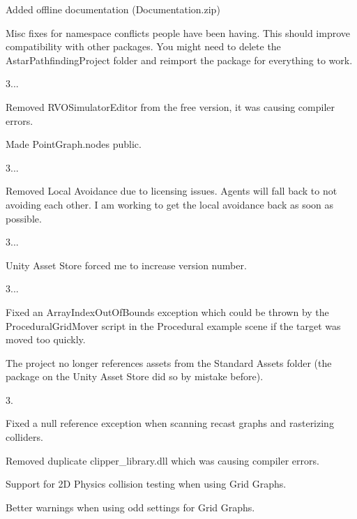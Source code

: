 \begin{DoxyItemize}
\begin{DoxyItemize}
\item Added offline documentation (Documentation.\+zip)
\item Misc fixes for namespace conflicts people have been having. This should improve compatibility with other packages. You might need to delete the Astar\+Pathfinding\+Project folder and reimport the package for everything to work.
\end{DoxyItemize}
\item 3...
\begin{DoxyItemize}
\item Removed R\+V\+O\+Simulator\+Editor from the free version, it was causing compiler errors.
\item Made Point\+Graph.\+nodes public.
\end{DoxyItemize}
\item 3...
\begin{DoxyItemize}
\item Removed Local Avoidance due to licensing issues. Agents will fall back to not avoiding each other. I am working to get the local avoidance back as soon as possible.
\end{DoxyItemize}
\item 3...
\begin{DoxyItemize}
\item Unity Asset Store forced me to increase version number.
\end{DoxyItemize}
\item 3...
\begin{DoxyItemize}
\item Fixed an Array\+Index\+Out\+Of\+Bounds exception which could be thrown by the Procedural\+Grid\+Mover script in the Procedural example scene if the target was moved too quickly.
\item The project no longer references assets from the Standard Assets folder (the package on the Unity Asset Store did so by mistake before).
\end{DoxyItemize}
\item 3.
\begin{DoxyItemize}
\item Fixed a null reference exception when scanning recast graphs and rasterizing colliders.
\item Removed duplicate clipper\+\_\+library.\+dll which was causing compiler errors.
\item Support for 2D Physics collision testing when using Grid Graphs.
\item Better warnings when using odd settings for Grid Graphs.

\end{DoxyItemize}
\end{DoxyItemize}
